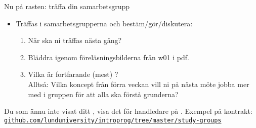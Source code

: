 \begin{Slide}{Nu på rasten: träffa din samarbetsgrupp}
\begin{itemize}
\item Träffas i samarbetsgrupperna och bestäm/gör/diskutera:
\begin{enumerate}
\item När ska ni träffas nästa gång?
\item Bläddra igenom föreläsningsbilderna från w01 i pdf.
\item Vilka  är fortfarande (mest) ? \\Alltså: Vilka koncept från förra veckan vill ni på nästa möte jobba mer med i gruppen för att alla ska förstå grunderna?
\end{enumerate}
\end{itemize}
\vspace{1em}Du som ännu inte visat ditt , visa det för handledare på . Exempel på kontrakt:
\\\href{https://github.com/lunduniversity/introprog/tree/master/study-groups}{\footnotesize\texttt{github.com/lunduniversity/introprog/tree/master/study-groups}}
\end{Slide}


